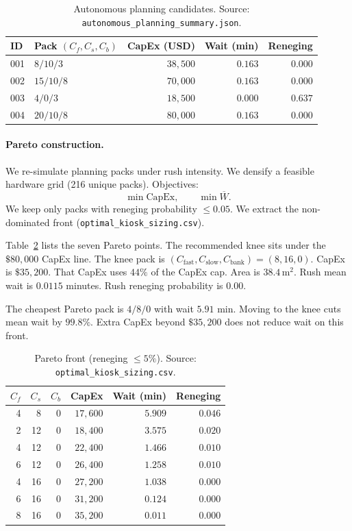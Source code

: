 \documentclass[11pt]{article}
\begin{document}
\begin{table}[htbp]
\centering
\caption{Autonomous planning candidates.
Source: \texttt{autonomous\_planning\_summary.json}.}
\label{tab:plan}
\begin{tabular}{llrrr}
\toprule
ID & Pack $(C_f,C_s,C_b)$ & CapEx (USD) & Wait (min) & Reneging \\
\midrule
001 & $8/10/3$ & $38{,}500$ & $0.163$ & $0.000$ \\
002 & $15/10/8$ & $70{,}000$ & $0.163$ & $0.000$ \\
003 & $4/0/3$ & $18{,}500$ & $0.000$ & $0.637$ \\
004 & $20/10/8$ & $80{,}000$ & $0.163$ & $0.000$ \\
\bottomrule
\end{tabular}
\end{table}

\paragraph{Pareto construction.}
We re-simulate planning packs under rush intensity.
We densify a feasible hardware grid (216 unique packs).
Objectives:
\[
\min \mathrm{CapEx},\qquad \min \overline{W}.
\]
We keep only packs with reneging probability $\le 0.05$.
We extract the non-dominated front
(\texttt{optimal\_kiosk\_sizing.csv}).

Table~\ref{tab:pareto} lists the seven Pareto points.
The recommended knee sits under the $\$80{,}000$ CapEx line.
The knee pack is $(C_{\mathrm{fast}},C_{\mathrm{slow}},C_{\mathrm{bank}})=(8,16,0)$.
CapEx is $\$35{,}200$.
That CapEx uses $44\%$ of the CapEx cap.
Area is $38.4\,\mathrm{m}^2$.
Rush mean wait is $0.0115$ minutes.
Rush reneging probability is $0.00$.

The cheapest Pareto pack is $4/8/0$ with wait $5.91$ min.
Moving to the knee cuts mean wait by $99.8\%$.
Extra CapEx beyond $\$35{,}200$ does not reduce wait on this front.

\begin{table}[htbp]
\centering
\caption{Pareto front (reneging $\le 5\%$).
Source: \texttt{optimal\_kiosk\_sizing.csv}.}
\label{tab:pareto}
\begin{tabular}{rrrrrr}
\toprule
$C_f$ & $C_s$ & $C_b$ & CapEx & Wait (min) & Reneging \\
\midrule
4 & 8 & 0 & $17{,}600$ & $5.909$ & $0.046$ \\
2 & 12 & 0 & $18{,}400$ & $3.575$ & $0.020$ \\
4 & 12 & 0 & $22{,}400$ & $1.466$ & $0.010$ \\
6 & 12 & 0 & $26{,}400$ & $1.258$ & $0.010$ \\
4 & 16 & 0 & $27{,}200$ & $1.038$ & $0.000$ \\
6 & 16 & 0 & $31{,}200$ & $0.124$ & $0.000$ \\
8 & 16 & 0 & $35{,}200$ & $0.011$ & $0.000$ \\
\bottomrule
\end{tabular}
\end{table}
\end{document}
